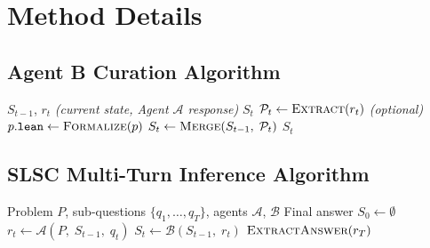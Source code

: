 \clearpage
\appendix

\section{Method Details}
\label{app:method_details}

\subsection{Agent B Curation Algorithm}
\label{app:curation_alg}

\begin{algorithm}[h]
\caption{Agent $\mathcal{B}$ Curation: extract atomic propositions from response, optionally formalize each, then merge into compressed state.}\label{alg:curation}
\begin{algorithmic}[1]
\Require $S_{t-1}$,\; $r_t$ \hfill \textit{(current state, Agent $\mathcal{A}$ response)}
\Ensure $S_t$
\State $\mathcal{P}_t \gets \textsc{Extract}(r_t)$
 \hfill \textit{(optional)}
    \State $p.\mathtt{lean} \gets \textsc{Formalize}(p)$
\EndFor
\State $S_t \gets \textsc{Merge}(S_{t-1},\; \mathcal{P}_t)$
\State \Return $S_t$
\end{algorithmic}
\end{algorithm}

\subsection{SLSC Multi-Turn Inference Algorithm}
\label{app:inference_alg}

\begin{algorithm}[h]
\caption{SLSC Multi-Turn Inference: iterate over sub-questions, alternating Agent $\mathcal{A}$ reasoning and Agent $\mathcal{B}$ state curation, then extract the final answer.}
\label{alg:inference}
\begin{algorithmic}[1]
\Require Problem $P$, sub-questions $\{q_1, \ldots, q_T\}$, agents $\mathcal{A}$, $\mathcal{B}$
\Ensure Final answer
\State $S_0 \gets \emptyset$
    \State $r_t \gets \mathcal{A}(P,\; S_{t-1},\; q_t)$
    \State $S_t \gets \mathcal{B}(S_{t-1},\; r_t)$
\EndFor
\State \Return $\textsc{ExtractAnswer}(r_T)$
\end{algorithmic}
\end{algorithm}

